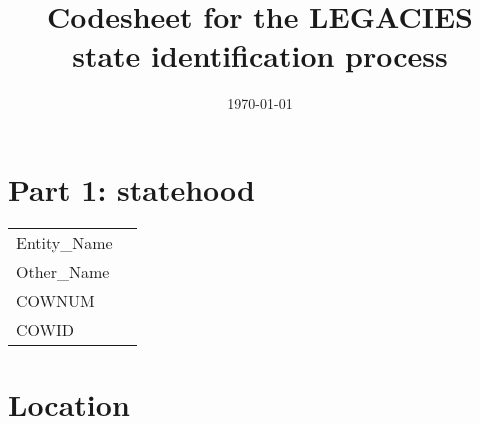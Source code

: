 \documentclass[11pt]{article}
\date{\today}
\title{Codesheet for the LEGACIES state identification process}
\begin{document}
\maketitle
\tableofcontents


\section{Part 1: statehood}
\label{sec:orgeb131cc}

\begin{center}
\begin{tabular}{ll}
 & \\
\hline
Entity\_Nam​e & \\
Other\_Name & \\
COWNUM & \\
COWID & \\
\end{tabular}
\end{center}

\section{Location}
\label{sec:orgdd92436}
\end{document}
